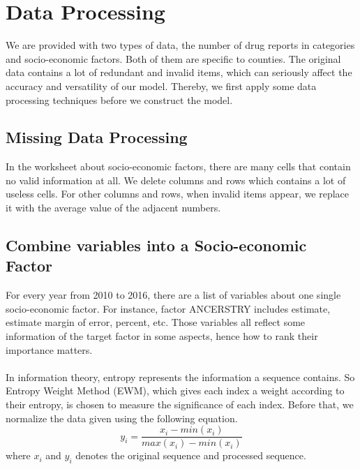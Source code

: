 \documentclass[12pt]{article}
\newcommand{\upcite}[1]{\textsuperscript{\textsuperscript{\cite{#1}}}}
\begin{document}
\section{Data Processing}
We are provided with two types of data, the number of drug reports in categories and socio-economic factors. Both of them are specific to counties. The original data contains a lot of redundant and invalid items, which can seriously affect the accuracy and versatility of our model. Thereby, we first apply some data processing techniques before we construct the model.

\subsection{Missing Data Processing}
In the worksheet about socio-economic factors, there are many cells that contain no valid information at all. We delete columns and rows which contains a lot of useless cells. For other columns and rows, when invalid items appear, we replace it with the average value of the adjacent numbers.

\subsection{Combine variables into a Socio-economic Factor}
For every year from 2010 to 2016, there are a list of variables about one single socio-economic factor. For instance, factor ANCERSTRY includes estimate, estimate margin of error, percent, etc. Those variables all reflect some information of the target factor in some aspects, hence how to rank their importance matters. 

In information theory, entropy represents the information a sequence contains\upcite{3}. So Entropy Weight Method (EWM), which gives each index a weight according to their entropy, is chosen to measure the significance of each index. Before that, we normalize the data given using the following equation.
\begin{equation}
	y_{i} = \frac{x_{i}-min(x_{i})}{max(x_{i}) - min(x_{i})}
\end{equation}
where $x_{i}$ and $y_{i}$ denotes the original sequence and processed sequence.
\end{document}

